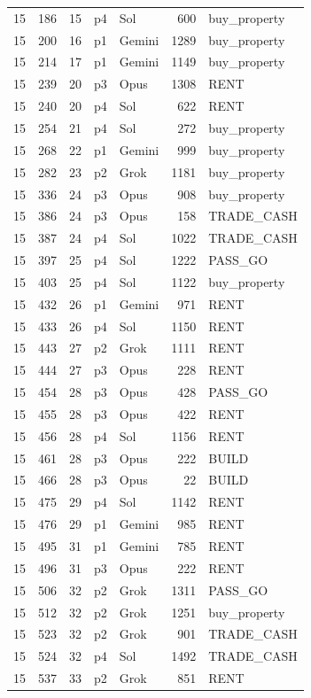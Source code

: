 \begin{longtable}{r r r l l r L{2.2in}}
15 & 186 & 15 & p4 & Sol & 600 & buy\_property \\
15 & 200 & 16 & p1 & Gemini & 1289 & buy\_property \\
15 & 214 & 17 & p1 & Gemini & 1149 & buy\_property \\
15 & 239 & 20 & p3 & Opus & 1308 & RENT \\
15 & 240 & 20 & p4 & Sol & 622 & RENT \\
15 & 254 & 21 & p4 & Sol & 272 & buy\_property \\
15 & 268 & 22 & p1 & Gemini & 999 & buy\_property \\
15 & 282 & 23 & p2 & Grok & 1181 & buy\_property \\
15 & 336 & 24 & p3 & Opus & 908 & buy\_property \\
15 & 386 & 24 & p3 & Opus & 158 & TRADE\_CASH \\
15 & 387 & 24 & p4 & Sol & 1022 & TRADE\_CASH \\
15 & 397 & 25 & p4 & Sol & 1222 & PASS\_GO \\
15 & 403 & 25 & p4 & Sol & 1122 & buy\_property \\
15 & 432 & 26 & p1 & Gemini & 971 & RENT \\
15 & 433 & 26 & p4 & Sol & 1150 & RENT \\
15 & 443 & 27 & p2 & Grok & 1111 & RENT \\
15 & 444 & 27 & p3 & Opus & 228 & RENT \\
15 & 454 & 28 & p3 & Opus & 428 & PASS\_GO \\
15 & 455 & 28 & p3 & Opus & 422 & RENT \\
15 & 456 & 28 & p4 & Sol & 1156 & RENT \\
15 & 461 & 28 & p3 & Opus & 222 & BUILD \\
15 & 466 & 28 & p3 & Opus & 22 & BUILD \\
15 & 475 & 29 & p4 & Sol & 1142 & RENT \\
15 & 476 & 29 & p1 & Gemini & 985 & RENT \\
15 & 495 & 31 & p1 & Gemini & 785 & RENT \\
15 & 496 & 31 & p3 & Opus & 222 & RENT \\
15 & 506 & 32 & p2 & Grok & 1311 & PASS\_GO \\
15 & 512 & 32 & p2 & Grok & 1251 & buy\_property \\
15 & 523 & 32 & p2 & Grok & 901 & TRADE\_CASH \\
15 & 524 & 32 & p4 & Sol & 1492 & TRADE\_CASH \\
15 & 537 & 33 & p2 & Grok & 851 & RENT \\

\end{longtable}
